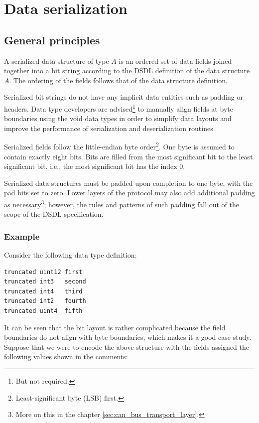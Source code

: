 \section{Data serialization}\label{sec:dsdl_data_serialization}

\subsection{General principles}

A serialized data structure of type $A$ is an ordered set of data fields joined together into a bit string
according to the DSDL definition of the data structure $A$.
The ordering of the fields follows that of the data structure definition.

Serialized bit strings do not have any implicit data entities such as padding or headers.
Data type developers are advised\footnote{But not required.} to manually align fields at
byte boundaries using the void data types
in order to simplify data layouts and improve the performance of serialization and deserialization routines.

Serialized fields follow the little-endian byte order\footnote{Least-significant byte (LSB) first.}.
One byte is assumed to contain exactly eight bits.
Bits are filled from the most significant bit to the least significant bit,
i.e., the most significant bit has the index 0.

Serialized data structures must be padded upon completion to one byte,
with the pad bits set to zero.
Lower layers of the protocol may also add additional padding as
necessary\footnote{More on this in the chapter \ref{sec:can_bus_transport_layer}.};
however, the rules and patterns of such padding fall out of the scope of the DSDL specification.

\subsubsection{Example}

Consider the following data type definition:

\begin{verbatim}
truncated uint12 first
truncated int3   second
truncated int4   third
truncated int2   fourth
truncated uint4  fifth
\end{verbatim}

It can be seen that the bit layout is rather complicated because the field boundaries do not align with byte
boundaries, which makes it a good case study.
Suppose that we were to encode the above structure with the fields assigned the following values
shown in the comments:

